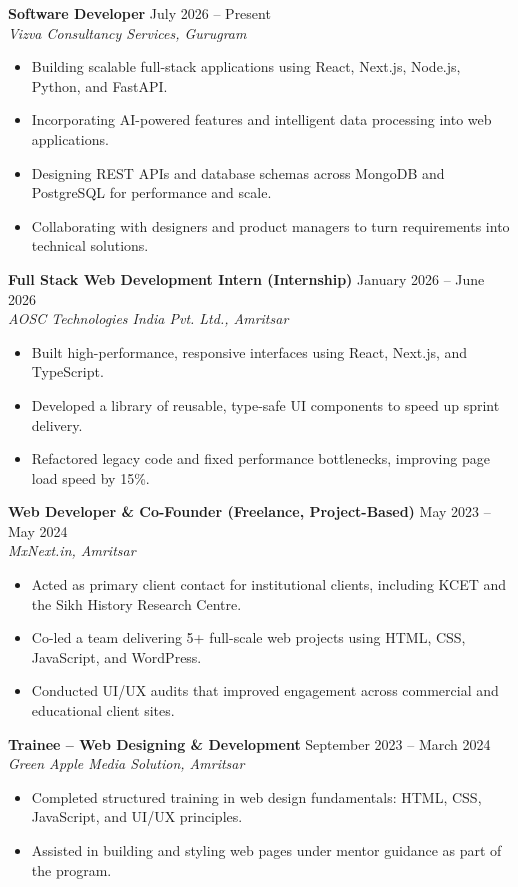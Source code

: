 \documentclass[10.5pt,a4paper]{article}
\newcommand{\jobheader}[3]{%
  \noindent\textbf{#1} \hfill #2 \\
  \textit{#3}
}
\begin{document}
\jobheader{Software Developer}{July 2026 -- Present}{Vizva Consultancy Services, Gurugram}
\begin{itemize}
    \item Building scalable full-stack applications using React, Next.js, Node.js, Python, and FastAPI.
    \item Incorporating AI-powered features and intelligent data processing into web applications.
    \item Designing REST APIs and database schemas across MongoDB and PostgreSQL for performance and scale.
    \item Collaborating with designers and product managers to turn requirements into technical solutions.
\end{itemize}

\jobheader{Full Stack Web Development Intern \textnormal{(Internship)}}{January 2026 -- June 2026}{AOSC Technologies India Pvt. Ltd., Amritsar}
\begin{itemize}
    \item Built high-performance, responsive interfaces using React, Next.js, and TypeScript.
    \item Developed a library of reusable, type-safe UI components to speed up sprint delivery.
    \item Refactored legacy code and fixed performance bottlenecks, improving page load speed by 15\%.
\end{itemize}

\jobheader{Web Developer \& Co-Founder \textnormal{(Freelance, Project-Based)}}{May 2023 -- May 2024}{MxNext.in, Amritsar}
\begin{itemize}
    \item Acted as primary client contact for institutional clients, including KCET and the Sikh History Research Centre.
    \item Co-led a team delivering 5+ full-scale web projects using HTML, CSS, JavaScript, and WordPress.
    \item Conducted UI/UX audits that improved engagement across commercial and educational client sites.
\end{itemize}

\jobheader{Trainee -- Web Designing \& Development}{September 2023 -- March 2024}{Green Apple Media Solution, Amritsar}
\begin{itemize}
    \item Completed structured training in web design fundamentals: HTML, CSS, JavaScript, and UI/UX principles.
    \item Assisted in building and styling web pages under mentor guidance as part of the program.
\end{itemize}
\end{document}
